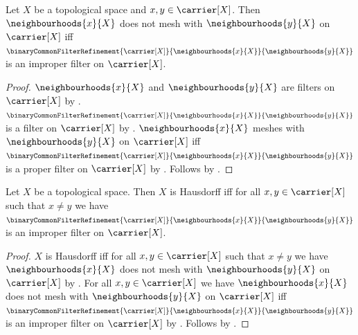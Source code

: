 \begin{theorem}\label{neighbourhood_filters_do_not_mesh_iff_common_refinement_improper}
    Let $X$ be a topological space and $x,y\in\carrier[X]$.
    Then $\neighbourhoods{x}{X}$ does not mesh with
        $\neighbourhoods{y}{X}$ on $\carrier[X]$ iff
        $\binaryCommonFilterRefinement{\carrier[X]}{
            \neighbourhoods{x}{X}}{\neighbourhoods{y}{X}}$
        is an improper filter on $\carrier[X]$.
\end{theorem}
\begin{proof}
    $\neighbourhoods{x}{X}$ and $\neighbourhoods{y}{X}$ are filters on
        $\carrier[X]$ by .
    $\binaryCommonFilterRefinement{\carrier[X]}{
        \neighbourhoods{x}{X}}{\neighbourhoods{y}{X}}$ is a filter on
        $\carrier[X]$ by .
    $\neighbourhoods{x}{X}$ meshes with $\neighbourhoods{y}{X}$ on
        $\carrier[X]$ iff
        $\binaryCommonFilterRefinement{\carrier[X]}{
            \neighbourhoods{x}{X}}{\neighbourhoods{y}{X}}$
        is a proper filter on $\carrier[X]$ by
        .
    Follows by .
\end{proof}

\begin{theorem}\label{hausdorff_iff_neighbourhood_common_refinements_improper}
    Let $X$ be a topological space.
    Then $X$ is Hausdorff iff for all $x,y\in\carrier[X]$ such that
        $x\neq y$ we have
        $\binaryCommonFilterRefinement{\carrier[X]}{
            \neighbourhoods{x}{X}}{\neighbourhoods{y}{X}}$
        is an improper filter on $\carrier[X]$.
\end{theorem}
\begin{proof}
    $X$ is Hausdorff iff for all $x,y\in\carrier[X]$ such that
        $x\neq y$ we have $\neighbourhoods{x}{X}$ does not mesh with
        $\neighbourhoods{y}{X}$ on $\carrier[X]$ by
        .
    For all $x,y\in\carrier[X]$ we have
        $\neighbourhoods{x}{X}$ does not mesh with
            $\neighbourhoods{y}{X}$ on $\carrier[X]$ iff
        $\binaryCommonFilterRefinement{\carrier[X]}{
            \neighbourhoods{x}{X}}{\neighbourhoods{y}{X}}$
        is an improper filter on $\carrier[X]$ by
        .
    Follows by \auto.
\end{proof}

